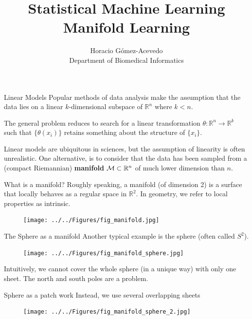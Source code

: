 \documentclass{beamer}
\title{Statistical Machine Learning\\ Manifold Learning}
\author{Horacio G\'omez-Acevedo\\ Department of Biomedical Informatics}
\begin{document}
	\begin{frame}[plain]
		\maketitle
	\end{frame}
\begin{frame}{Linear Models}
	Popular methods of data analysis make the assumption that the data lies on a linear $k$-dimensional subspace of $\mathbb{R}^n$ where $k< n$. 
	
	The general problem reduces to search for a linear transformation $\theta \colon \mathbb{R}^n \to \mathbb{R}^k$ such that $\{\theta(x_i)\}$ retains something about the structure of $\{x_i\}$. 
	
	Linear models are ubiquitous in sciences, but the assumption of linearity is often unrealistic. One alternative, is to consider that the data has been sampled from a (compact Riemannian) \textbf{manifold} ${\cal M}\subset \mathbb{R}^n$ of much lower dimension than $n$. 

\end{frame}

\begin{frame}{What is a manifold?}
	Roughly speaking, a manifold (of dimension 2) is a surface that locally behaves as a regular space in $\mathbb{R}^2$. In geometry, we refer to local properties as intrinsic. 
\begin{figure}[h]
	\centering
	\texttt{[image: ../../Figures/fig\_manifold.jpg]}
\end{figure}	
		
\end{frame}

\begin{frame}{The Sphere as a manifold}
	Another typical example is the sphere (often called $S^2$).
	
\begin{figure}[h]
	\centering
	\texttt{[image: ../../Figures/fig\_manifold\_sphere.jpg]}
\end{figure}	
Intuitively, we cannot cover the whole sphere (in a unique way) with only one sheet. The north and south poles are a problem. 

\end{frame}

\begin{frame}{Sphere as a patch work}
	Instead, we use several overlapping sheets 
\begin{figure}[h]
	\centering
	\texttt{[image: ../../Figures/fig\_manifold\_sphere\_2.jpg]}
\end{figure}		
	
	
\end{frame}
\end{document}
